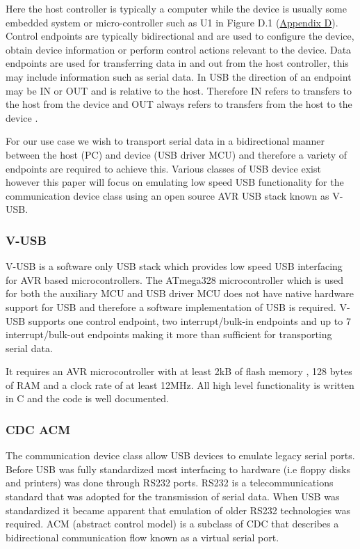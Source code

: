 Here the host controller is typically a computer while the device is usually some embedded system or micro-controller such as U1 in Figure D.1 (\hyperref[sec:usbmcu]{Appendix D}). Control endpoints are typically bidirectional and are used to configure the device, obtain device information or perform control actions relevant to the device. Data endpoints are used for transferring data in and out from the host controller, this may include information such as serial data. In USB the direction of an endpoint may be IN or OUT and is relative to the host. Therefore IN refers to transfers to the host from the device and OUT always refers to transfers from the host to the device \cite{usb_endpoints}.

For our use case we wish to transport serial data in a bidirectional manner between the host (PC) and device (USB driver MCU) and therefore a variety of endpoints are required to achieve this. Various classes of USB device exist however this paper will focus on emulating low speed USB functionality for the communication device class using an open source AVR USB stack known as V-USB.

\subsubsection{V-USB}
V-USB is a software only USB stack which provides low speed USB interfacing for AVR based microcontrollers. The ATmega328 microcontroller which is used for both the auxiliary MCU and USB driver MCU does not have native hardware support for USB and therefore a software implementation of USB is required. V-USB supports one control endpoint, two interrupt/bulk-in endpoints and up to 7 interrupt/bulk-out endpoints making it more than sufficient for transporting serial data.

It requires an AVR microcontroller with at least 2kB of flash memory , 128 bytes of RAM and a clock rate of at least 12MHz. All high level functionality is written in C and the code is well documented.

\subsubsection{CDC ACM}
The communication device class allow USB devices to emulate legacy serial ports. Before USB was fully standardized most interfacing to hardware (i.e floppy disks and printers) was done through RS232 ports. RS232 is a telecommunications standard that was adopted for the transmission of serial data. When USB was standardized it became apparent that emulation of older RS232 technologies was required. ACM (abstract control model) is a subclass of CDC that describes a bidirectional communication flow known as a virtual serial port. 


